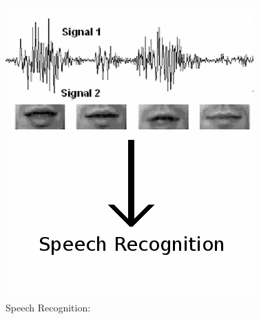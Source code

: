 \documentclass{beamer}
\begin{document}
\begin{frame}
\begin{figure}
\begin{minipage}[b]{0.38\linewidth}
      \includegraphics[width=\textwidth]{./Images/SpeechRecognitioncopy.png}
      \caption{Speech Recognition: \cite{Dactu2007}}
    \end{minipage}
    \hfill
  \end{figure}
\end{frame}
\end{document}
